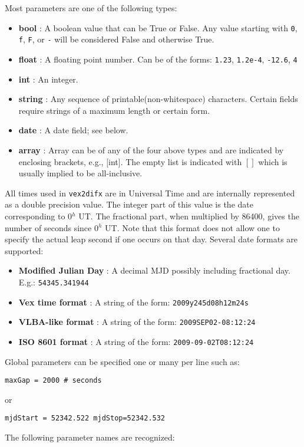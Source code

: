 Most parameters are one of the following types:
\begin{itemize}
\item {\bf bool} : A boolean value that can be True or False.  Any value starting with {\tt 0}, {\tt f}, {\tt F}, or {\tt -} will be considered False and otherwise True.
\item {\bf float} : A floating point number.  Can be of the forms: {\tt 1.23}, {\tt 1.2e-4}, {\tt -12.6}, {\tt 4}
\item {\bf int} : An integer.
\item {\bf string} : Any sequence of printable(non-whitespace) characters.  Certain fields require strings of a maximum length or certain form.
\item {\bf date} : A date field; see below.
\item {\bf array} :  Array can be of any of the four above types and are indicated by enclosing brackets, e.g., $[$int$]$.  The empty list is indicated with $[ ]$ which is usually implied to be all-inclusive.
\end{itemize}

All times used in {\tt vex2difx} are in Universal Time and are internally represented as a double precision value.
The integer part of this value is the date corresponding to 0$^h$ UT.
The fractional part, when multiplied by 86400, gives the number of seconds since 0$^h$ UT.
Note that this format does not allow one to specify the actual leap second if one occurs on that day.
Several date formats are supported:
\begin{itemize}
\item {\bf Modified Julian Day} : A decimal MJD possibly including fractional day.  E.g.: {\tt 54345.341944}
\item {\bf Vex time format} : A string of the form: {\tt 2009y245d08h12m24s}
\item {\bf VLBA-like format} : A string of the form: {\tt 2009SEP02-08:12:24}
\item {\bf ISO 8601 format} : A string of the form: {\tt 2009-09-02T08:12:24}
\end{itemize}

Global parameters can be specified one or many per line such as:

\noindent
{\tt maxGap = 2000 \# seconds}

\noindent
or

\noindent
{\tt mjdStart = 52342.522 mjdStop=52342.532}

The following parameter names are recognized:

